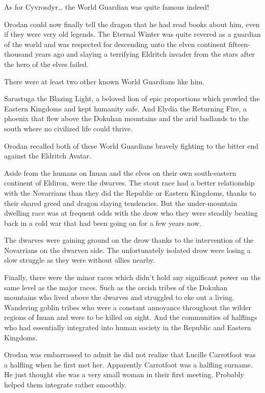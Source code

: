 \documentclass[a4paper,10pt]{book}
\begin{document}
As for Cyvrosdyr… the World Guardian was quite famous indeed!\par
Orodan could now finally tell the dragon that he had read books about him, even if they were very old legends. The Eternal Winter was quite revered as a guardian of the world and was respected for descending unto the elven continent fifteen-thousand years ago and slaying a terrifying Eldritch invader from the stars after the hero of the elves failed.\par
There were at least two other known World Guardians like him.\par
Sarastuga the Blazing Light, a beloved lion of epic proportions which prowled the Eastern Kingdoms and kept humanity safe. And Elydia the Returning Fire, a phoenix that flew above the Dokuhan mountains and the arid badlands to the south where no civilized life could thrive.\par
Orodan recalled both of these World Guardians bravely fighting to the bitter end against the Eldritch Avatar.\par
Aside from the humans on Inuan and the elves on their own south-eastern continent of Eldiron, were the dwarves. The stout race had a better relationship with the Novarrians than they did the Republic or Eastern Kingdoms, thanks to their shared greed and dragon slaying tendencies. But the under-mountain dwelling race was at frequent odds with the drow who they were steadily beating back in a cold war that had been going on for a few years now.\par
The dwarves were gaining ground on the drow thanks to the intervention of the Novarrians on the dwarven side. The unfortunately isolated drow were losing a slow struggle as they were without allies nearby.\par
Finally, there were the minor races which didn’t hold any significant power on the same level as the major races. Such as the orcish tribes of the Dokuhan mountains who lived above the dwarves and struggled to eke out a living. Wandering goblin tribes who were a constant annoyance throughout the wilder regions of Inuan and were to be killed on sight. And the communities of halflings who had essentially integrated into human society in the Republic and Eastern Kingdoms.\par
Orodan was embarrassed to admit he did not realize that Lucille Carrotfoot was a halfling when he first met her. Apparently Carrotfoot was a halfling surname. He just thought she was a very small woman in their first meeting. Probably helped them integrate rather smoothly.\par
\end{document}
